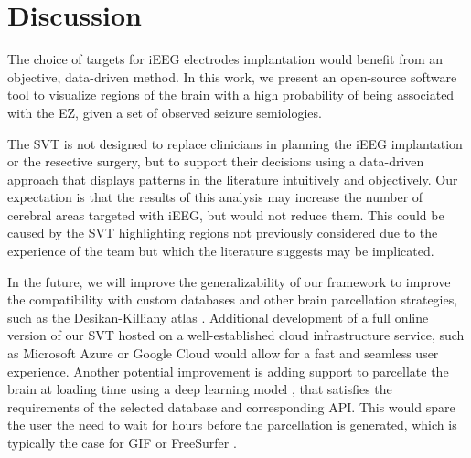 \section{Discussion}
\label{sec:svt_discussion}

The choice of targets for \ac{iEEG} electrodes implantation would benefit from an objective, data-driven method.
In this work, we present an open-source software tool to visualize regions of the brain with a high probability of being associated with the \ac{EZ}, given a set of observed seizure semiologies.

The \ac{SVT} is not designed to replace clinicians in planning the \ac{iEEG} implantation or the resective surgery, but to support their decisions using a data-driven approach that displays patterns in the literature intuitively and objectively.
Our expectation is that the results of this analysis may increase the number of cerebral areas targeted with \ac{iEEG}, but would not reduce them.
This could be caused by the \ac{SVT} highlighting regions not previously considered due to the experience of the team but which the literature suggests may be implicated.  %

In the future, we will improve the generalizability of our framework to improve the compatibility with custom databases and other brain parcellation strategies, such as the Desikan-Killiany atlas \cite{desikan_automated_2006}.
Additional development of a full online version of our \ac{SVT} hosted on a well-established cloud infrastructure service, such as Microsoft Azure or Google Cloud would allow for a fast and seamless user experience.
Another potential improvement is adding support to parcellate the brain at loading time using a deep learning model \cite{li_compactness_2017,perez-garcia_fepegarhighresnet_2019}, that satisfies the requirements of the selected database and corresponding \ac{API}.
This would spare the user the need to wait for hours before the parcellation is generated, which is typically the case for \ac{GIF} \cite{cardoso_geodesic_2015} or FreeSurfer%
.
